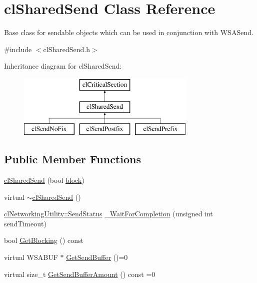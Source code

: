 \hypertarget{classcl_shared_send}{
\section{clSharedSend Class Reference}
\label{classcl_shared_send}
}


Base class for sendable objects which can be used in conjunction with WSASend.  




{\ttfamily \#include $<$clSharedSend.h$>$}

Inheritance diagram for clSharedSend:\begin{figure}[H]
\begin{center}
\leavevmode
\includegraphics[height=3.000000cm]{classcl_shared_send}
\end{center}
\end{figure}
\subsection*{Public Member Functions}
\begin{DoxyCompactItemize}
\item 
\hyperlink{classcl_shared_send_ade96a6e38f87f56bdffd71b4f204cef0}{clSharedSend} (bool \hyperlink{classcl_shared_send_aaaf411d2405cc3447a3bc11fe2ab2678}{block})
\item 
virtual \hyperlink{classcl_shared_send_a1cd1c319d365feb7b39e1bb1f0b6f31b}{$\sim$clSharedSend} ()
\item 
\hyperlink{classcl_networking_utility_a19389cda12603396e03caa9d82073803}{clNetworkingUtility::SendStatus} \hyperlink{classcl_shared_send_ae4b621d0e5504631b945552e9506cf5d}{\_\-WaitForCompletion} (unsigned int sendTimeout)
\item 
bool \hyperlink{classcl_shared_send_aead146143909b8dbfb8e29214a063380}{GetBlocking} () const 
\item 
virtual WSABUF $\ast$ \hyperlink{classcl_shared_send_a14aee968543a692af33c5d170b2cc1fe}{GetSendBuffer} ()=0
\item 
virtual size\_\-t \hyperlink{classcl_shared_send_afb9437432c75b81100927297961413a3}{GetSendBufferAmount} () const =0
\end{DoxyCompactItemize}
